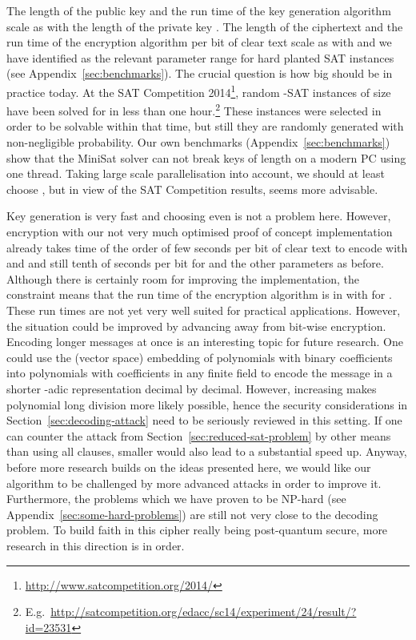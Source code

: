 \documentclass[final,journal,compsoc]{IEEEtran}
\begin{document}
The length of the public key and the run time of the key
generation algorithm scale as  with the length of the
private key . The length of the ciphertext and the run time of the
encryption algorithm per bit of clear text scale as
 with  and we have identified
 as the relevant parameter range for hard planted SAT
instances (see Appendix~\ref{sec:benchmarks}). The crucial
question is how big  should be in practice today.  At the SAT
Competition 2014\footnote{\url{http://www.satcompetition.org/2014/}},
random -SAT instances of size  have been solved for
 in less than one
hour.\footnote{E.g.~\url{http://satcompetition.org/edacc/sc14/experiment/24/result/?id=23531}}
These instances were selected in order to be solvable within that
time, but still they are randomly generated with non-negligible
probability.  
Our own benchmarks
(Appendix~\ref{sec:benchmarks}) show that the MiniSat
solver \cite{minisat} can not break keys of
length  on a modern PC using one
thread. Taking large scale parallelisation into account, we should at
least choose , but in view of the SAT
Competition results,  seems more advisable.


Key generation is very fast and choosing even  is not a
problem here. However, encryption with our not very much optimised
proof of concept implementation \cite{code} already takes time of the
order of few seconds per bit of clear text to encode with  and  and still tenth of seconds per bit
for  and the other parameters as before.  Although there is
certainly room for improving the implementation, the constraint
 means that the run time of the encryption algorithm is
in  with  for .
These run times are not yet very well suited for practical
applications.  However, the situation could be improved by advancing
away from bit-wise encryption.  Encoding longer messages at once is an
interesting topic for future research. One could use the (vector
space) embedding of polynomials with binary coefficients into
polynomials with coefficients in any finite field  to
encode the message in a shorter -adic representation decimal by
decimal. However, increasing  makes polynomial long division more
likely possible, hence the security considerations in
Section~\ref{sec:decoding-attack} need to be seriously reviewed in
this setting.  If one can counter the attack from
Section~\ref{sec:reduced-sat-problem} by other means than using all
clauses, smaller  would also lead to a substantial speed
up. Anyway, before more research builds on the ideas presented here,
we would like our algorithm to be challenged by more advanced attacks
in order to improve it. Furthermore, the problems which we have proven
to be NP-hard (see Appendix~\ref{sec:some-hard-problems}) are still
not very close to the decoding problem. To build faith in this
cipher really being post-quantum secure, more research in this
direction is in order.
\end{document}

